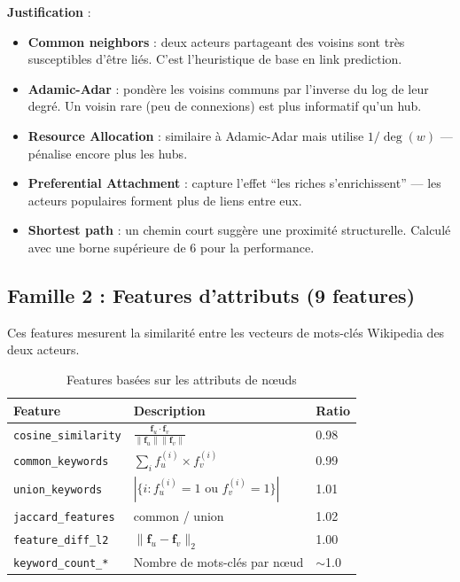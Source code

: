 \documentclass[12pt,a4paper]{article}
\begin{document}
\textbf{Justification} :
\begin{itemize}
    \item \textbf{Common neighbors} : deux acteurs partageant des voisins sont très susceptibles d'être liés. C'est l'heuristique de base en link prediction.
    \item \textbf{Adamic-Adar} : pondère les voisins communs par l'inverse du log de leur degré. Un voisin rare (peu de connexions) est plus informatif qu'un hub.
    \item \textbf{Resource Allocation} : similaire à Adamic-Adar mais utilise $1/\deg(w)$ — pénalise encore plus les hubs.
    \item \textbf{Preferential Attachment} : capture l'effet ``les riches s'enrichissent'' — les acteurs populaires forment plus de liens entre eux.
    \item \textbf{Shortest path} : un chemin court suggère une proximité structurelle. Calculé avec une borne supérieure de 6 pour la performance.
\end{itemize}

\subsection{Famille 2 : Features d'attributs (9 features)}

Ces features mesurent la similarité entre les vecteurs de mots-clés Wikipedia des deux acteurs.

\begin{table}[H]
\centering
\small
\begin{tabular}{p{4.5cm}p{7cm}p{2cm}}
\toprule
\textbf{Feature} & \textbf{Description} & \textbf{Ratio} \\
\midrule
\texttt{cosine\_similarity} & $\frac{\mathbf{f}_u \cdot \mathbf{f}_v}{\|\mathbf{f}_u\| \|\mathbf{f}_v\|}$ & 0.98 \\
\texttt{common\_keywords} & $\sum_i f_u^{(i)} \times f_v^{(i)}$ & 0.99 \\
\texttt{union\_keywords} & $|\{i : f_u^{(i)} = 1 \text{ ou } f_v^{(i)} = 1\}|$ & 1.01 \\
\texttt{jaccard\_features} & common / union & 1.02 \\
\texttt{feature\_diff\_l2} & $\|\mathbf{f}_u - \mathbf{f}_v\|_2$ & 1.00 \\
\texttt{keyword\_count\_*} & Nombre de mots-clés par nœud & $\sim$1.0 \\
\bottomrule
\end{tabular}
\caption{Features basées sur les attributs de nœuds}
\end{table}
\end{document}
